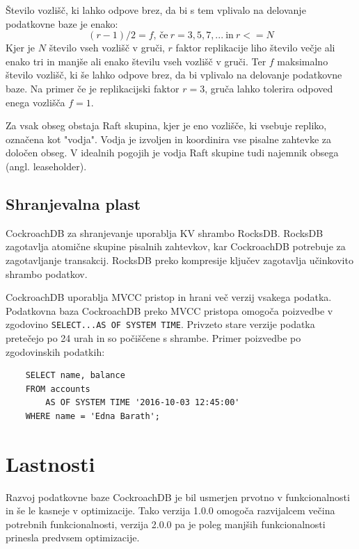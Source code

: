 \documentclass[a4paper, 12pt]{book}
\begin{document}
Število vozlišč, ki lahko odpove brez, da bi s tem vplivalo na delovanje podatkovne baze je enako:
\[(r - 1)/2 = f \text{, če}\ r = 3, 5, 7, ...\ \text{in}\ r <= N\]
Kjer je \(N\) število vseh vozlišč v gruči, \(r\) faktor replikacije liho število večje ali enako tri in manjše ali enako številu vseh vozlišč v gruči. Ter \(f\) maksimalno število vozlišč, ki še lahko odpove brez, da bi vplivalo na delovanje podatkovne baze. Na primer če je replikacijski faktor \(r = 3\), gruča lahko tolerira odpoved enega vozlišča \(f = 1\).

Za vsak obseg obstaja Raft skupina, kjer je eno vozlišče, ki vsebuje repliko, označena kot "vodja". Vodja je izvoljen in koordinira vse pisalne zahtevke za določen obseg. V idealnih pogojih je vodja Raft skupine tudi najemnik obsega (angl. leaseholder).


\subsection{Shranjevalna plast}

CockroachDB za shranjevanje uporablja KV shrambo RocksDB. RocksDB zagotavlja atomične skupine pisalnih zahtevkov, kar CockroachDB potrebuje za zagotavljanje transakcij. RocksDB preko kompresije ključev zagotavlja učinkovito shrambo podatkov.

CockroachDB uporablja MVCC pristop in hrani več verzij vsakega podatka. Podatkovna baza CockroachDB preko MVCC pristopa omogoča poizvedbe v zgodovino \texttt{SELECT...AS OF SYSTEM TIME}. Privzeto stare verzije podatka pretečejo po 24 urah in so počiščene s shrambe. Primer poizvedbe po zgodovinskih podatkih:

\begin{listing}[H]
\begin{verbatim}
    SELECT name, balance
    FROM accounts
        AS OF SYSTEM TIME '2016-10-03 12:45:00'
    WHERE name = 'Edna Barath';
\end{verbatim}
\label{sql-example-as-of-system-time}
\end{listing}

\newpage

\section{Lastnosti}
Razvoj podatkovne baze CockroachDB je bil usmerjen prvotno v funkcionalnosti in še le kasneje v optimizacije. Tako verzija 1.0.0 omogoča razvijalcem večina potrebnih funkcionalnosti, verzija 2.0.0 pa je poleg manjših funkcionalnosti prinesla predvsem optimizacije.
\end{document}
